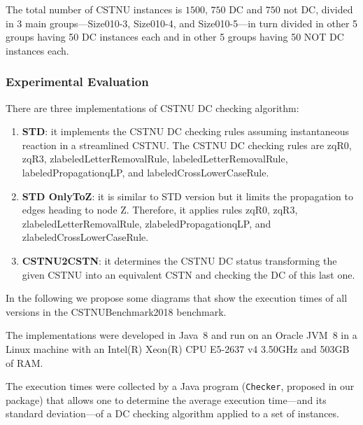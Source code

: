 \documentclass[a4paper,11pt]{article}
\begin{document}
The total number of CSTNU instances is $1500$, $750$ DC and $750$ not DC, divided in 3 main groups---Size010-3, Size010-4, and Size010-5---in turn divided in other 5 groups having 50 DC instances each and in other 5 groups having 50 NOT DC instances each.

  
\subsubsection{Experimental Evaluation}

There are three implementations of CSTNU DC checking algorithm:
\begin{enumerate}
	\item \textbf{STD}: it implements the CSTNU DC checking rules assuming instantaneous reaction in a streamlined CSTNU. The CSTNU DC checking rules are zqR0, zqR3, zlabeledLetterRemovalRule,
	labeledLetterRemovalRule, labeledPropagationqLP, and labeledCrossLowerCaseRule. 
	
	\item \textbf{STD OnlyToZ}: it is similar to STD version but it limits the propagation to edges heading to node Z. Therefore, it applies rules zqR0, zqR3, zlabeledLetterRemovalRule,
	zlabeledPropagationqLP, and zlabeledCrossLowerCaseRule. 
	
	\item \textbf{CSTNU2CSTN}: it determines the CSTNU DC status transforming the given CSTNU into an equivalent CSTN and checking the DC of this last one.
\end{enumerate}
In the following we propose some diagrams that show the execution times of all versions in the CSTNUBenchmark2018 benchmark.

The implementations were developed in Java~8 and run on an Oracle JVM~8 in a Linux machine with an Intel(R) Xeon(R) CPU E5-2637 v4 \@ 3.50GHz and 503GB of RAM.

The execution times were collected by a Java program (\texttt{Checker}, proposed in our package) that allows one to determine the average execution time---and its standard deviation---of a DC checking algorithm applied to a set of instances.
\end{document}
